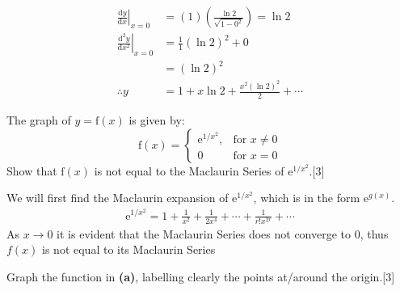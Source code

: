 \documentclass[12pt, a4 paper]{article}
\begin{document}
\begin{outline}[enumerate]
\begin{answer}
\begin{align*}
   \left.\frac{\mathrm{d}y}{\mathrm{d}x}\right|_{x=0}     & =(1)\left(\frac{\ln{2}}{\sqrt{1-0^2}}\right) = \ln{2} \\
   \left.\frac{\mathrm{d}^2y}{\mathrm{d}x^2}\right|_{x=0} & =\frac{1}{1}{(\ln{2})}^2+0                            \\
                                                          & = {(\ln{2})}^2                                        \\
   \therefore y                                           & = 1 + x\ln{2} + \frac{x^2{(\ln{2})}^2}{2} + \cdots
  \end{align*}
 \end{answer}

 \1 The graph of \(y=\textrm{f}(x)\) is given by: %
 \begin{equation*}
  \textrm{f}(x) = \begin{cases}
   \mathrm{e}^{1/x^2}, & \textrm{for }  x\neq0 \\
   0                   & \textrm{for } x=0
  \end{cases}
 \end{equation*}
 \2 Show that \(\textrm{f}(x)\) is not equal to the Maclaurin Series of \(\mathrm{e}^{1/x^2}\).\hfill[3]
 \begin{answer}
  We will first find the Maclaurin expansion of \(\mathrm{e}^{1/x^2}\), which is in the form \(\mathrm{e}^{g(x)}\).
  \begin{align*}
   \mathrm{e}^{1/x^2}=1+\frac{1}{x^2}+\frac{1}{2x^4}+\cdots+\frac{1}{r!x^{2r}}+\cdots
  \end{align*}
  As \( x\rightarrow0 \) it is evident that the Maclaurin Series does not converge to 0, thus \(f(x)\) is not equal to its Maclaurin Series
 \end{answer}
 \2 Graph the function in \textbf{(a)}, labelling clearly the points at/around the origin.\hfill[3]
 \begin{answer}
  \vspace{3mm}
  \color{black}
 \end{answer}


\end{outline}
\end{document}
